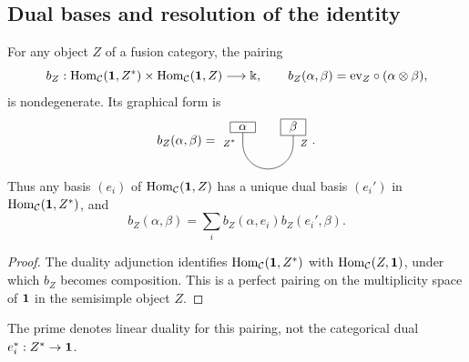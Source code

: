 \documentclass{amsart}
\begin{document}
\subsection{Dual bases and resolution of the identity}\label{sub:reso}
\begin{lemma}\label{lem:bili}
For any object $Z$ of a fusion category, the pairing
\[
 b_Z:\mathrm{Hom}_{\mathcal{C}}({\bf 1},Z^*)\times\mathrm{Hom}_{\mathcal{C}}({\bf 1},Z)\longrightarrow\Bbbk,
 \qquad b_Z(\alpha,\beta)=\mathrm{ev}_Z\circ(\alpha\otimes\beta),
\]
is nondegenerate. Its graphical form is
\[
b_Z(\alpha,\beta)=
\begin{tikzpicture}[baseline=(current bounding box.center),scale=.7]
\draw (0,.5)--(0,-.15) arc(180:360:1)--(2,.5);
\node[draw,fill=white,minimum width=.7cm,inner sep=2pt] at (0,.5) {$\alpha$};
\node[draw,fill=white,minimum width=.7cm,inner sep=2pt] at (2,.5) {$\beta$};
\node[left=2pt,font=\scriptsize] at (0,-.12) {$Z^*$};\node[right=2pt,font=\scriptsize] at (2,-.12) {$Z$};
\end{tikzpicture}.
\]
Thus any basis $(e_i)$ of $\mathrm{Hom}_{\mathcal{C}}({\bf 1},Z)$ has a unique
dual basis $(e_i')$ in $\mathrm{Hom}_{\mathcal{C}}({\bf 1},Z^*)$, and
\[
 b_Z(\alpha,\beta)=\sum_i b_Z(\alpha,e_i)b_Z(e_i',\beta).
\]
\end{lemma}
\begin{proof}
The duality adjunction \cite[Proposition~2.10.8]{EGNO15} identifies
$\mathrm{Hom}_{\mathcal{C}}({\bf 1},Z^*)$ with $\mathrm{Hom}_{\mathcal{C}}(Z,{\bf 1})$,
under which $b_Z$ becomes composition. This is a perfect pairing on the
multiplicity space of ${\bf 1}$ in the semisimple object $Z$.
\end{proof}
The prime denotes linear duality for this pairing, not the categorical dual
$e_i^*:Z^*\to{\bf 1}$.
\end{document}
